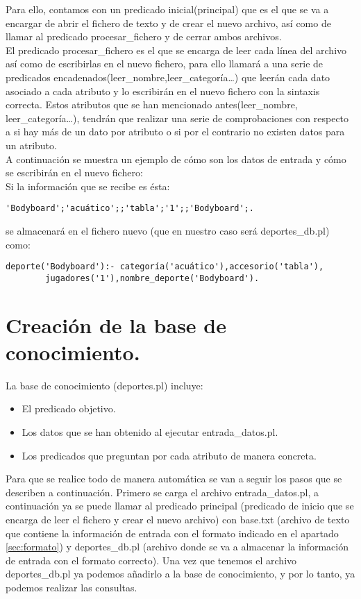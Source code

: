 Para ello, contamos con un predicado inicial(principal) que es el que se va a encargar de abrir el fichero de texto y de crear el nuevo archivo, así como de llamar al predicado procesar\_fichero y de cerrar ambos archivos.\\

El predicado procesar\_fichero es el que se encarga de leer cada línea del archivo así como de escribirlas en el nuevo fichero, para ello llamará a una serie de predicados encadenados(leer\_nombre,leer\_categoría\ldots) que leerán cada dato asociado a cada atributo y lo escribirán en el nuevo fichero con la sintaxis correcta. Estos atributos que se han mencionado antes(leer\_nombre, leer\_categoría\ldots), tendrán que realizar una serie de comprobaciones con respecto a si hay más de un dato por atributo o si por el contrario no existen datos para un atributo.\\

A continuación se muestra un ejemplo de cómo son los datos de entrada y cómo se escribirán en el nuevo fichero:\\

Si la información que se recibe es ésta:
\begin{verbatim}
'Bodyboard';'acuático';;'tabla';'1';;'Bodyboard';.
\end{verbatim}

se almacenará en el fichero nuevo (que en nuestro caso será deportes\_db.pl) como:
\begin{verbatim}
deporte('Bodyboard'):- categoría('acuático'),accesorio('tabla'),
		jugadores('1'),nombre_deporte('Bodyboard').
\end{verbatim}

\section{Creación de la base de conocimiento.}
La base de conocimiento (deportes.pl) incluye:
\begin{itemize}
 \item El predicado objetivo.
 \item Los datos que se han obtenido al ejecutar entrada\_datos.pl.
 \item Los predicados que preguntan por cada atributo de manera concreta.
\end{itemize}

Para que se realice todo de manera automática se van a seguir los pasos que se describen a continuación. Primero se carga el archivo entrada\_datos.pl, a continuación ya se puede llamar al predicado principal (predicado de inicio que se encarga de leer el fichero y crear el nuevo archivo) con base.txt (archivo de texto que contiene la información de entrada con el formato indicado en el apartado \ref{sec:formato}) y deportes\_db.pl (archivo donde se va a almacenar la información de entrada con el formato correcto). Una vez que tenemos el archivo deportes\_db.pl ya podemos añadirlo a la base de conocimiento, y por lo tanto, ya podemos realizar las consultas.